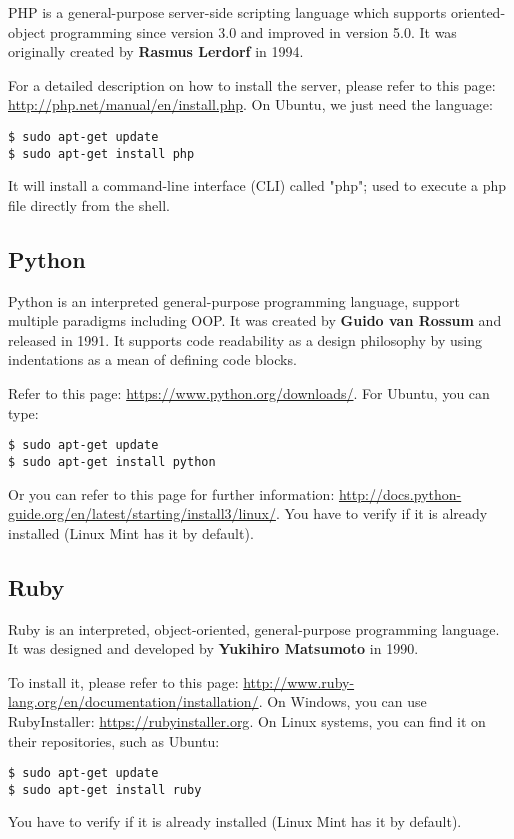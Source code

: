 \documentclass{KodeBook}
\begin{document}
PHP is a general-purpose server-side scripting language which supports oriented-object programming since version 3.0  and improved in version 5.0.
It was originally created by \textbf{Rasmus Lerdorf} in 1994. 

For a detailed description on how to install the server, please refer to this page: \url{http://php.net/manual/en/install.php}.
On Ubuntu, we just need the language:
\begin{lstlisting}[style=shellStyle]
$ sudo apt-get update
$ sudo apt-get install php
\end{lstlisting}
It will install a command-line interface (CLI) called "php"; used to execute a php file directly from the shell.

\subsection{Python}

Python is an interpreted general-purpose programming language, support multiple paradigms including OOP. 
It was created by \textbf{Guido van Rossum} and released in 1991.
It supports code readability as a design philosophy by using indentations as a mean of defining code blocks.

Refer to this page: \url{https://www.python.org/downloads/}. 
For Ubuntu, you can type:
\begin{lstlisting}[style=shellStyle]
$ sudo apt-get update
$ sudo apt-get install python
\end{lstlisting}
Or you can refer to this page for further information: \url{http://docs.python-guide.org/en/latest/starting/install3/linux/}.
You have to verify if it is already installed (Linux Mint has it by default).

\subsection{Ruby}

Ruby is an interpreted, object-oriented, general-purpose programming language. 
It was designed and developed by \textbf{Yukihiro Matsumoto} in 1990.

To install it, please refer to this page: \url{http://www.ruby-lang.org/en/documentation/installation/}. 
On Windows, you can use RubyInstaller: \url{https://rubyinstaller.org}.
On Linux systems, you can find it on their repositories, such as Ubuntu:
\begin{lstlisting}[style=shellStyle]
$ sudo apt-get update
$ sudo apt-get install ruby
\end{lstlisting}
You have to verify if it is already installed (Linux Mint has it by default).
\end{document}
